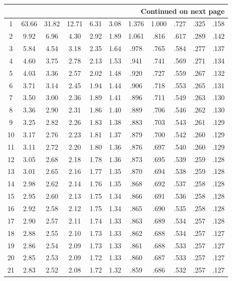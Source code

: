 \documentclass[12pt,a4paper]{article}
\begin{document}
\begin{enumerate}
\begin{center}
\begin{longtable}{c | ccccc | ccccc}
\midrule
\multicolumn{11}{r}{{Continued on next page}} \\
\bottomrule
\endfoot

\bottomrule
\endlastfoot

1 & 63.66 & 31.82 & 12.71 & 6.31 & 3.08 & 1.376 & 1.000 & .727 & .325 & .158 \\
2 & 9.92 & 6.96 & 4.30 & 2.92 & 1.89 & 1.061 & .816 & .617 & .289 & .142 \\
3 & 5.84 & 4.54 & 3.18 & 2.35 & 1.64 & .978 & .765 & .584 & .277 & .137 \\
4 & 4.60 & 3.75 & 2.78 & 2.13 & 1.53 & .941 & .741 & .569 & .271 & .134 \\
5 & 4.03 & 3.36 & 2.57 & 2.02 & 1.48 & .920 & .727 & .559 & .267 & .132 \\
6 & 3.71 & 3.14 & 2.45 & 1.94 & 1.44 & .906 & .718 & .553 & .265 & .131 \\
7 & 3.50 & 3.00 & 2.36 & 1.89 & 1.41 & .896 & .711 & .549 & .263 & .130 \\
8 & 3.36 & 2.90 & 2.31 & 1.86 & 1.40 & .889 & .706 & .546 & .262 & .130 \\
9 & 3.25 & 2.82 & 2.26 & 1.83 & 1.38 & .883 & .703 & .543 & .261 & .129 \\
10 & 3.17 & 2.76 & 2.23 & 1.81 & 1.37 & .879 & .700 & .542 & .260 & .129 \\
11 & 3.11 & 2.72 & 2.20 & 1.80 & 1.36 & .876 & .697 & .540 & .260 & .129 \\
12 & 3.05 & 2.68 & 2.18 & 1.78 & 1.36 & .873 & .695 & .539 & .259 & .128 \\
13 & 3.01 & 2.65 & 2.16 & 1.77 & 1.35 & .870 & .694 & .538 & .259 & .128 \\
14 & 2.98 & 2.62 & 2.14 & 1.76 & 1.35 & .868 & .692 & .537 & .258 & .128 \\
15 & 2.95 & 2.60 & 2.13 & 1.75 & 1.34 & .866 & .691 & .536 & .258 & .128 \\
16 & 2.92 & 2.58 & 2.12 & 1.75 & 1.34 & .865 & .690 & .535 & .258 & .128 \\
17 & 2.90 & 2.57 & 2.11 & 1.74 & 1.33 & .863 & .689 & .534 & .257 & .128 \\
18 & 2.88 & 2.55 & 2.10 & 1.73 & 1.33 & .862 & .688 & .534 & .257 & .127 \\
19 & 2.86 & 2.54 & 2.09 & 1.73 & 1.33 & .861 & .688 & .533 & .257 & .127 \\
20 & 2.85 & 2.53 & 2.09 & 1.72 & 1.33 & .860 & .687 & .533 & .257 & .127 \\
21 & 2.83 & 2.52 & 2.08 & 1.72 & 1.32 & .859 & .686 & .532 & .257 & .127 \\

\end{longtable}
\end{center}
\end{enumerate}
\end{document}
